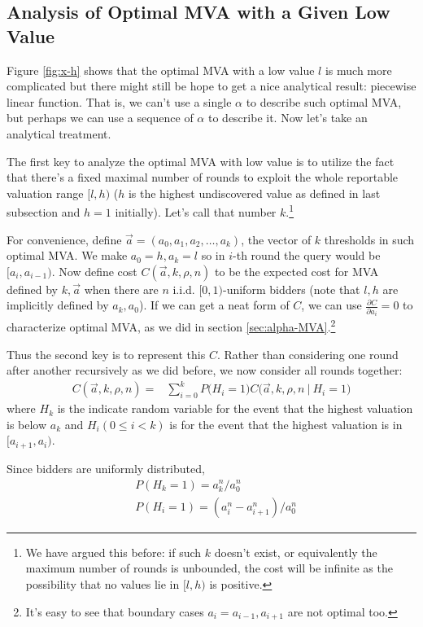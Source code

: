 \subsection{Analysis of Optimal MVA with a Given Low Value}\label{sec:general_analysis}

Figure \ref{fig:x-h} shows that the optimal MVA with a low value $l$ is
much more complicated but there might still be hope to get a nice analytical
result: piecewise linear function. That is, we can't use a single $\alpha$ to
describe such optimal MVA, but perhaps we can use a sequence of $\alpha$ to
describe it. Now let's take an analytical treatment.

The first key to analyze the optimal MVA with low value is to utilize
the fact that there's a fixed maximal number of rounds to exploit the whole
reportable valuation range $[l, h)$ ($h$ is the highest undiscovered
value as defined in last subsection and $h = 1$ initially). Let's call that
number $k$.\footnote{We have argued this before: if such $k$ doesn't exist, or equivalently
the maximum number of rounds is unbounded, the cost will be infinite as the possibility that no
values lie in $[l, h)$ is positive.}

For convenience, define $\vec a = (a_0, a_1, a_2, \ldots, a_k)$, the vector of
$k$ thresholds in such optimal MVA. We make $a_0 = h, a_k = l$ so in $i$-th
round the query would be $[a_i, a_{i-1})$. Now define cost $C(\vec a, k, \rho,
n)$ to be the expected cost for MVA defined by $k, \vec a$ when there are $n$
i.i.d.  $[0, 1)$-uniform bidders (note that $l, h$ are implicitly defined by
$a_k, a_0$). If we can get a neat form of $C$, we can use $\frac{\partial
C}{\partial a_i} = 0 $ to characterize optimal MVA, as we did in section
\ref{sec:alpha-MVA}.\footnote{It's easy to see that boundary cases $a_i = a_{i-1},
a_{i+1}$ are not optimal too.}

Thus the second key is to represent this $C$. Rather than
considering one round after another recursively as we did before, we now consider all
rounds together:
\begin{align*}
C(\vec a, k, \rho, n) =
&\sum_{i=0}^k P\big(H_i = 1\big) C\big(\vec a, k, \rho, n ~\big|~ H_i = 1 \big)
\end{align*}
where $H_k$ is the indicate random variable for the event that the highest
valuation is below $a_k$ and $H_i(0 \leq i < k)$ is for the event that the highest
valuation is in $[a_{i+1}, a_i)$.

Since bidders are uniformly distributed,
\begin{align*}
  &P(H_k = 1) = a_k^n / a_0^n\\
    &P(H_i = 1) = (a_{i}^n-a_{i+1}^n) / a_0^n
\end{align*}

